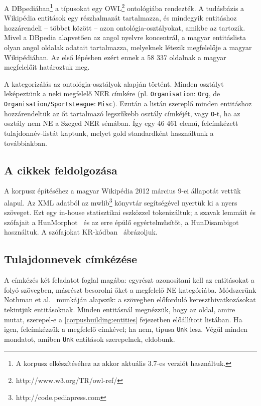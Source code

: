 \documentclass{llncs}
\begin{document}
A DBpediában\footnote{A korpusz elkészítéséhez az akkor aktuális 3.7-es verziót
használtuk.} a típusokat egy OWL\footnote{http://www.w3.org/TR/owl-ref/}
ontológiába rendezték. A tudásbázis a Wikipédia entitások egy részhalmazát
tartalmazza, és mindegyik entitáshoz hozzárendeli -- többet között -- azon
ontológia-osztályokat, amikbe az tartozik. Mivel a DBpedia alapvetően az angol
nyelvre koncentrál, a magyar entitáslista olyan angol oldalak adatait
tartalmazza, melyeknek létezik megfelelője a magyar Wikipédiában. Az első
lépésben ezért ennek a 58 337 oldalnak a magyar megfelelőit határoztuk meg.

A kategorizálás az ontológia-osztályok alapján történt. Minden osztályt
leképeztünk a neki megfelelő NER címkére (pl. \texttt{Organisation}:
\texttt{Org}, de \texttt{Organisation/SportsLeague}: \texttt{Misc}).  %
Ezután a listán szereplő minden entitáshoz hozzárendeltük az őt tartalmazó
legszűkebb osztály címkéjét, vagy \texttt{O}-t, ha az osztály nem NE a Szeged
NER sémában. Így egy 46 461 elemű, felcímkézett tulajdonnév-listát kaptunk,
melyet gold standardként használtunk a továbbiakban.

\subsection{A cikkek feldolgozása}

A korpusz építéséhez a magyar Wikipédia 2012 március 9-ei állapotát vettük
alapul. Az XML adatból az mwlib\footnote{http://code.pediapress.com}
könyvtár segítségével nyertük ki a nyers szöveget. Ezt egy in-house statisztikai %
eszközzel tokenizáltuk; a szavak lemmáit és szófajait a
HunMorphot~\cite{Tron:05} és az erre épülő egyértelműsítőt, a HunDisambigot
használtuk. A szófajokat KR-kódban~\cite{Kornai:04} ábrázoljuk.

\subsection{Tulajdonnevek címkézése}

A címkézés két feladatot foglal magába: egyrészt azonosítani kell az
entitásokat a folyó szövegben, másrészt besorolni őket a megfelelő NE
kategóriába. Módszerünk Nothman et al.~\cite{Nothman:08} munkáján alapszik:
a szövegben előforduló kereszthivatkozásokat tekintjük entitásoknak. Minden
entitásnál megnézzük, hogy az oldal, amire mutat, szerepel-e a
\ref{corpusbuilding:entities} fejezetben előállított listában. Ha igen,
felcímkézzük a megfelelő címkével; ha nem, típusa \texttt{Unk} lesz. Végül
minden mondatot, amiben \texttt{Unk} entitások szerepelnek, eldobunk.
\end{document}
